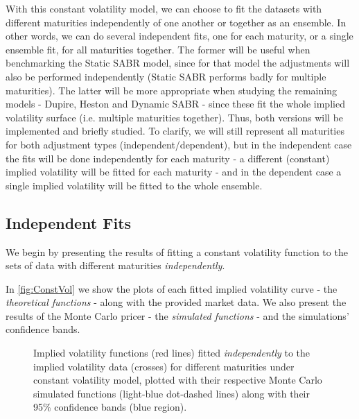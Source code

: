 With this constant volatility model, we can choose to fit the datasets with different maturities independently of one another or together as an ensemble. In other words, we can do several independent fits, one for each maturity, or a single ensemble fit, for all maturities together. The former will be useful when benchmarking the Static SABR model, since for that model the adjustments will also be performed independently (Static SABR performs badly for multiple maturities). The latter will be more appropriate when studying the remaining models - Dupire, Heston and Dynamic SABR - since these fit the whole implied volatility surface (i.e. multiple maturities together). Thus, both versions will be implemented and briefly studied. To clarify, we will still represent all maturities for both adjustment types (independent/dependent), but in the independent case the fits will be done independently for each maturity - a different (constant) implied volatility will be fitted for each maturity - and in the dependent case a single implied volatility will be fitted to the whole ensemble.

\vfill
\newpage

\subsection{Independent Fits}
We begin by presenting the results of fitting a constant volatility function to the sets of data with different maturities \emph{independently}.


In \autoref{fig:ConstVol} we show the plots of each fitted implied volatility curve - the \emph{theoretical functions} - along with the provided market data. We also present the results of the Monte Carlo pricer - the \emph{simulated functions} - and the simulations' confidence bands.
\begin{figure}[H]
  \begin{subfigmatrix}{2}
  \end{subfigmatrix}
  \caption[Implied volatility functions fitted independently to the implied volatility data for different maturities under constant volatility model, plotted with their respective Monte Carlo simulated functions along with their 95\% confidence bands.]{Implied volatility functions (red lines) fitted \emph{independently} to the implied volatility data (crosses) for different maturities under constant volatility model, plotted with their respective Monte Carlo simulated functions (light-blue dot-dashed lines) along with their 95\% confidence bands (blue region).}
  \label{fig:ConstVol}
\end{figure}

